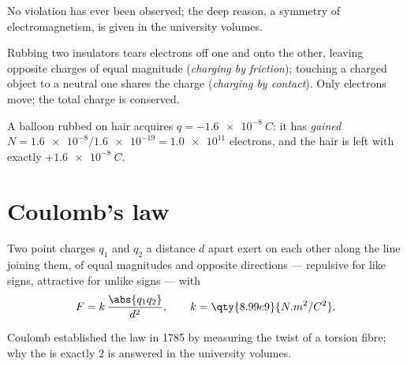 \begin{remark}\label{rem:g11:fundamental-interactions:conservation}
No violation has ever been observed; the deep reason, a symmetry of
electromagnetism, is given in the university volumes.
\end{remark}

\begin{definition}\label{def:g11:fundamental-interactions:charging}
Rubbing two insulators tears electrons off one and onto the other,
leaving opposite charges of equal magnitude (\emph{charging by
friction}); touching a charged object to a
neutral one shares the charge (\emph{charging by
contact}). Only electrons move; the total
charge is conserved.
\end{definition}

\begin{example}\label{ex:g11:fundamental-interactions:balloon}
A balloon rubbed on hair acquires $q = \qty{-1.6e-8}{C}$: it has
\emph{gained} $N = \num{1.6e-8} / \num{1.6e-19} = \num{1.0e11}$
electrons, and the hair is left with exactly $+\qty{1.6e-8}{C}$.
\end{example}

\section{Coulomb's law}

\begin{theorem}\label{thm:g11:fundamental-interactions:coulomb}
Two point charges $q_1$ and $q_2$ a distance $d$ apart exert on each
other  along the line joining them, of equal magnitudes and
opposite directions --- repulsive for like signs, attractive for unlike
signs --- with
\[
F = k\,\frac{\abs{q_1 q_2}}{d^{2}},
\qquad k = \qty{8.99e9}{N.m^2/C^2}.
\]
\end{theorem}
\admitted

\begin{remark}\label{rem:g11:fundamental-interactions:torsion}
Coulomb established the law in 1785 by measuring the twist of a 
torsion fibre; why the  is exactly $2$ is answered in the university volumes.
\end{remark}

